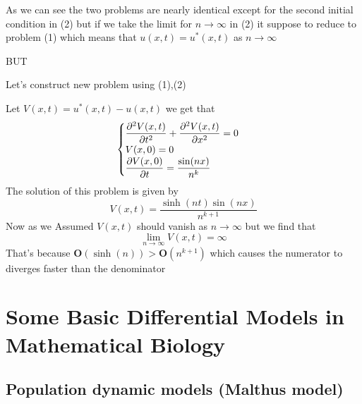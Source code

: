 As we can see the two problems are nearly identical except for the second initial condition in (2) but if we take the
limit for $n \to \infty$ in (2) it suppose to reduce to problem (1) which means that $u(x,t) = u^{*}(x,t)$ as $n \to \infty$

BUT

Let's construct new problem using (1),(2)

Let $V(x,t) = u^{*}(x,t) - u(x,t)$ we get that
\begin{equation}
    \begin{cases}
        \displaystyle \pdv[2]{V(x,t)}{t} + \pdv[2]{V(x,t)}{x} = 0
        \\
        V(x,0) = 0
        \\
        \displaystyle \pdv{V(x,0)}{t} =\frac{\sin(nx)}{n^{k}}
    \end{cases}
\end{equation}
The solution of this problem is given by
\[
    V(x,t) = \frac{\sinh(nt)\sin(nx)}{n^{k+1}}
\]
Now as we Assumed $V(x,t)$ should vanish as $n \to \infty$ but we find that
\[
    \lim_{n \to \infty} V(x,t) = \infty
\]
That's because $\mathbf{O}(\sinh(n)) > \mathbf{O}(n^{k+1})$ which causes the numerator to diverges faster than the denominator
\setcounter{equation}{0}
\section{Some Basic Differential Models in Mathematical Biology}
\subsection{Population dynamic models (Malthus model)}

